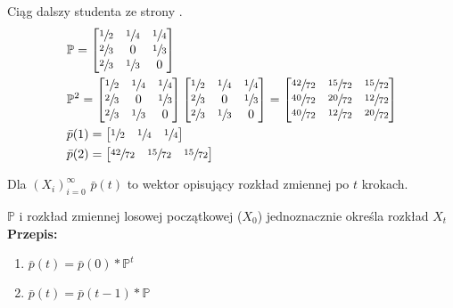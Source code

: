 \begin{example*}
Ciąg dalszy studenta ze strony \pageref{exa:student}.
\begin{align*}
&\mathbb{P}=\begin{bmatrix}
\sfrac{1}{2} & \sfrac{1}{4} & \sfrac{1}{4} \\
\sfrac{2}{3} & 0 & \sfrac{1}{3}\\
\sfrac{2}{3} & \sfrac{1}{3} &0 
\end{bmatrix}\\
&\mathbb{P}^2=\begin{bmatrix}
\sfrac{1}{2} & \sfrac{1}{4} & \sfrac{1}{4} \\
\sfrac{2}{3} & 0 & \sfrac{1}{3}\\
\sfrac{2}{3} & \sfrac{1}{3} &0 
\end{bmatrix}\begin{bmatrix}
\sfrac{1}{2} & \sfrac{1}{4} & \sfrac{1}{4} \\
\sfrac{2}{3} & 0 & \sfrac{1}{3}\\
\sfrac{2}{3} & \sfrac{1}{3} &0 
\end{bmatrix}=\begin{bmatrix}
\sfrac{42}{72} & \sfrac{15}{72} & \sfrac{15}{72} \\
\sfrac{40}{72} & \sfrac{20}{72} & \sfrac{12}{72}\\
\sfrac{40}{72} & \sfrac{12}{72} & \sfrac{20}{72}
\end{bmatrix}\\
&\bar{p}(1)=\begin{bmatrix}
\sfrac{1}{2} & \sfrac{1}{4} & \sfrac{1}{4}
\end{bmatrix}\\
&\bar{p}(2)=\begin{bmatrix}
\sfrac{42}{72} & \sfrac{15}{72} & \sfrac{15}{72}
\end{bmatrix}
\end{align*}
\end{example*}

Dla $(X_i)_{i=0}^\infty$ $\bar{p}(t)$ to wektor opisujący rozkład zmiennej po $t$ krokach.

\begin{fact*}
$\mathbb{P}$ i rozkład zmiennej losowej początkowej ($X_0$) jednoznacznie określa rozkład $X_t$\\
\textbf{Przepis:}
\begin{enumerate}[label=\arabic*.]
\item $\bar{p}(t)=\bar{p}(0)*\mathbb{P}^t$
\item $\bar{p}(t)=\bar{p}(t-1)*\mathbb{P}$
\end{enumerate}
\end{fact*}

